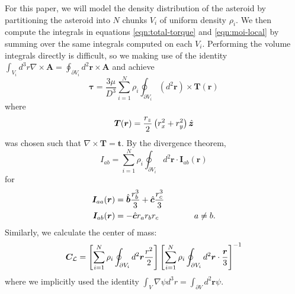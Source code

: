 \documentclass[aps,twocolumn,secnumarabic,balancelastpage,amsmath,amssymb,nofootinbib,floatfix]{revtex4-1}
\begin{document}
For this paper, we will model the density distribution of the asteroid by partitioning the asteroid into $N$ chunks $V_i$ of uniform density $\rho_i$. We then compute the integrals in equations \ref{eqn:total-torque} and \ref{eqn:moi-local} by summing over the same integrals computed on each $V_i$. Performing the volume integrals directly is difficult, so we making use of the identity $\int_{V_i} d^3 r \nabla \times \bm A = \oint_{\partial V_i} d^2 \bm r \times \bm A$
and achieve
\begin{equation}
    \bm \tau = \frac{3\mu}{D^3} \sum_{i=1}^N \rho_i\oint_{\partial V_i} (d^2 \bm r) \times \bm T(\bm r)
    \label{eqn:surface-torque}
\end{equation}
where
\begin{equation}
    \bm T(\bm r) = \frac{r_z}{2}\left( r_x^2 + r_y^2 \right)\hat{\bm z}
    \label{eqn:torque-generator}
\end{equation}
was chosen such that $\nabla \times \bm T = \bm t$. By the divergence theorem,
\begin{equation}
    I_{ab} = \sum_{i=1}^N \rho_i\oint_{\partial V_i} d^2 \bm r \cdot \bm I_{ab}(\bm r)
    \label{eqn:surface-moi}
\end{equation}
for
\begin{equation}
\begin{aligned}
    \bm I_{aa}(\bm r)& = \hat{\bm b} \frac{r_b^3}{3} + \hat{\bm c} \frac{r_c^3}{3} \\
    \bm I_{ab}(\bm r)& = -\hat{\bm c} r_a r_b r_c \hspace{1.5 cm} a \neq b
    \label{eqn:moi-generator}.
\end{aligned}
\end{equation}
Similarly, we calculate the center of mass:
\begin{equation}
    \bm C_\mathcal{L} = \left[ \sum_{i=1}^N \rho_i \oint_{\partial V_i}d^2 \bm r \frac{r^2}{2} \right]\left[ \sum_{i=1}^N \rho_i \oint_{\partial V_i}d^2 \bm r \cdot \frac{\bm r}{3} \right]^{-1}
    \label{eqn:com-surf}
\end{equation}
where we implicitly used the identity $\int_V \nabla \psi d^3 r = \int_{\partial V} d^2 \bm r \psi$.
\end{document}
